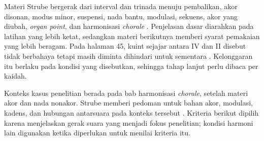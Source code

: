 Materi Strube bergerak dari interval dan trinada menuju pembalikan, akor disonan, modus minor, suspensi, nada bantu, modulasi, sekuens, akor yang diubah, \textit{organ point}, dan harmonisasi \textit{chorale} \parencite{strube1928}. Penjelasan dasar diarahkan pada latihan yang lebih ketat, sedangkan materi berikutnya memberi syarat pemakaian yang lebih beragam. Pada halaman 45, kuint sejajar antara IV dan II disebut tidak berbahaya tetapi masih diminta dihindari untuk sementara \parencite[45]{strube1928}. Kelonggaran itu berlaku pada kondisi yang disebutkan, sehingga tahap lanjut perlu dibaca per kaidah.

Konteks kasus penelitian berada pada bab harmonisasi \textit{chorale}, setelah materi akor dan nada nonakor. Strube memberi pedoman untuk bahan akor, modulasi, kadens, dan hubungan antarsuara pada konteks tersebut \parencite[174]{strube1928}. Kriteria berikut dipilih karena menjelaskan gerak suara yang menjadi fokus penelitian; kondisi harmoni lain digunakan ketika diperlukan untuk menilai kriteria itu.

